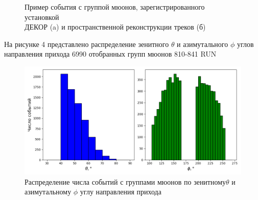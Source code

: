 \begin{figure}[ht]
    \centering


    \caption{Пример события с группой мюонов, зарегистрированного установкой \\ДЕКОР (a) и пространственной реконструкции треков (б)}
    \label{fig:muon_example}
\end{figure}

\newpage
На рисунке 4 представлено распределение зенитного \(\theta\) и азимутального \(\phi\) углов направления прихода 6990 отобранных групп мюонов 810-841 RUN

\begin{figure}[ht]
    \lefting
    \includegraphics[width=1\textwidth]{images/theta_phi.png}
    \caption{Распределение числа событий с группами мюонов по зенитному\(\theta\) и азимутальному \(\phi\) углу направления прихода}
    \label{fig:phi_hist}
\end{figure}

\endinput